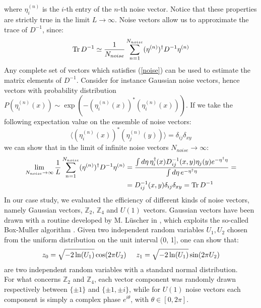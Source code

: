 where $\eta_i^{(n)}$ is the $i$-th entry of the $n$-th noise vector. Notice that these properties are strictly true in the limit $L \to \infty$.
Noise vectors allow us to approximate the trace of $D^{-1}$, since:
\begin{equation}\label{Noise trace}
    \Tr D^{-1} \simeq \frac{1}{N_{noise}} \sum_{n = 1}^{N_{noise}} (\eta^{(n)})^\dagger D^{-1} \eta^{(n)}
\end{equation}
Any complete set of vectors which satisfies (\ref{noise}) can be used to estimate the matrix elements of $D^{-1}$. Consider for instance Gaussian noise vectors, hence vectors with probability distribution $P(\eta^{(n)}_i(x)) \sim \exp(-(\eta^{(n)}_i(x))^*(\eta^{(n)}_i(x)))$. If we take the following expectation value on the ensemble of noise vectors:
\begin{equation}
    \langle (\eta^{(n)}_i(x))^*(\eta^{(n)}_j(y)) \rangle = \delta_{ij} \delta_{xy}
\end{equation}
we can show that in the limit of infinite noise vectors $N_{noise} \to \infty$:
\begin{equation}
    \begin{split}
        \lim_{N_{noise} \to \infty} \frac{1}{L} \sum_{n = 1}^{N_{noise}} (\eta^{(n)})^\dagger D^{-1} \eta^{(n)} & = \frac{\int d\eta \, \eta^\dagger_i(x) D^{-1}_{ij}(x,y) \eta_j(y) e^{-\eta^\dagger \eta}}{\int d\eta \, e^{-\eta^\dagger \eta}} = \\ & = D^{-1}_{ij}(x,y)\delta_{ij} \delta_{xy} = \Tr D^{-1} 
    \end{split}
\end{equation}
In our case study, we evaluated the efficiency of different kinds of noise vectors, namely Gaussian vectors, $\mathbb{Z}_2$, $\mathbb{Z}_4$ and $U(1)$ vectors. Gaussian vectors have been drawn with a routine developed by M. Lüscher in \cite{L_scher_1994}, which exploits the so-called Box-Muller algorithm \cite{10.1214/aoms/1177706645}. Given two independent random variables $U_1, U_2$ chosen from the uniform distribution on the unit interval (0, 1], one can show that:
\begin{equation}
    z_0 = \sqrt{-2 \ln(U_1)} \cos(2\pi U_2) \hspace{5 mm} z_1 = \sqrt{-2 \ln(U_1)} \sin(2\pi U_2) 
\end{equation}
are two independent random variables with a standard normal distribution.
\\ For what concerns $\mathbb{Z}_2$ and $\mathbb{Z}_4$, each vector component was randomly drawn respectively between $\{\pm 1\}$ and $\{\pm 1, \pm i\}$, while for $U(1)$ noise vectors each component is simply a complex phase $e^{i\theta}$, with $\theta \in \left[0, 2\pi\right]$.
